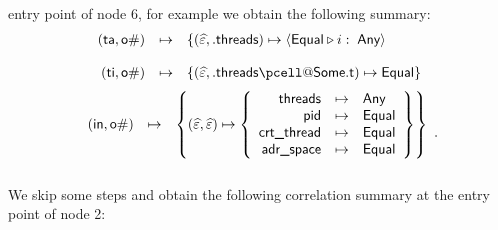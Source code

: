\documentclass[11pt]{article}
\begin{document}
entry point of node 6, for example we obtain the following summary:
\[
\begin{array}{rll}
(\tsf{ta}, \tsf{o\#}) & \mapsto &\{(\pempty, .\textrm{\tsf{threads}}) \mapsto \aerel{\equal}{i}{\qmark}\\\\
(\tsf{ti}, \tsf{o\#}) & \mapsto &\{(\pempty, .\textrm{\tsf{threads}}\pcell@\textrm{\tsf{Some.t}}) \mapsto \equal\}\\
\end{array}
\]
\[
\begin{array}{rll}
(\textsf{in},\textsf{o\#}) &\mapsto 
           &\left\{ (\widehat{\varepsilon}, \widehat{\varepsilon}) \mapsto
           \left\{\begin{array}{rll}
           \textrm{\textsf{threads}} &\mapsto &\textsf{Any} \\
           \textrm{\textsf{pid}} &\mapsto &\textsf{Equal} \\
           \textrm{\textsf{crt\_thread}} &\mapsto &\textsf{Equal} \\
           \textrm{\textsf{adr\_space}} &\mapsto&\textsf{Equal}
           \end{array}\right\}\right\} \\\\
\end{array}.
\]
We skip some steps and obtain the following correlation summary at the entry
point of node 2:
\end{document}
